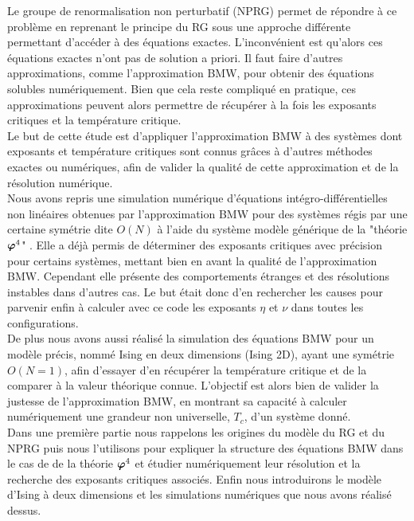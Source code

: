 \documentclass[10pt]{article}
\begin{document}
\begin{multicols}{2}
Le groupe de renormalisation non perturbatif (NPRG) permet de répondre à ce problème en reprenant le principe du RG sous une approche différente permettant d'accéder à des équations exactes. L'inconvénient est qu'alors ces équations exactes n'ont pas de solution a priori. Il faut faire d'autres approximations, comme l'approximation BMW, pour obtenir des équations solubles numériquement. Bien que cela reste compliqué en pratique, ces approximations peuvent alors permettre de récupérer à la fois les exposants critiques et la température critique. \\

Le but de cette étude est d'appliquer l'approximation BMW à des systèmes dont exposants et température critiques sont connus grâces à d'autres méthodes exactes ou numériques, afin de valider la qualité de cette approximation et de la résolution numérique.\\
\indent
Nous avons repris une simulation numérique d'équations intégro-différentielles non linéaires obtenues par l'approximation BMW pour des systèmes régis par une certaine symétrie dite $O(N)$ à l'aide du système modèle générique de la "théorie $\boldsymbol{ \varphi}^4$" \cite{LeonardThesis}. Elle a déjà permis de déterminer des exposants critiques avec précision pour certains systèmes, mettant bien en avant la qualité de l'approximation BMW. Cependant elle présente des comportements étranges et des résolutions instables dans d'autres cas. Le but était donc d'en rechercher les causes pour parvenir enfin à calculer avec ce code les exposants $\eta$ et $\nu$ dans toutes les configurations.\\
\indent
De plus nous avons aussi réalisé la simulation des équations BMW pour un modèle précis, nommé Ising en deux dimensions (Ising 2D), ayant une symétrie $O(N=1)$, afin d'essayer d'en récupérer la température critique et de la comparer à la valeur théorique connue. L'objectif est alors bien de valider la justesse de l'approximation BMW, en montrant sa capacité à calculer numériquement une grandeur non universelle, $T_c$, d'un système donné. \\

Dans une première partie nous rappelons les origines du modèle du RG et du NPRG puis nous l'utilisons pour expliquer la structure des équations BMW dans le cas de de la théorie $\boldsymbol{ \varphi}^4$ et étudier numériquement leur résolution et la recherche des exposants critiques associés. Enfin nous introduirons le modèle d'Ising à deux dimensions et les simulations numériques que nous avons réalisé dessus. 



\end{multicols}
\end{document}
